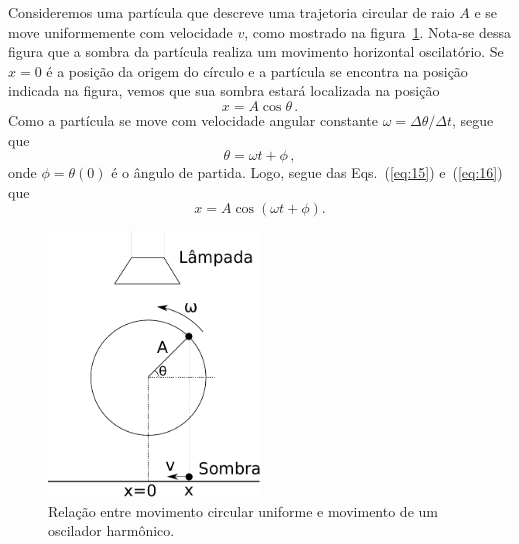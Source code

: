 \documentclass[12pt,a4paper]{article}
\theoremstyle{definition}
\begin{document}
Consideremos uma partícula que descreve uma trajetoria circular de
raio $A$ e se move uniformemente com velocidade $v$, como mostrado na
figura~\ref{fig:ociladoranalogia}. Nota-se dessa figura que a sombra
da partícula realiza um movimento horizontal oscilatório. Se $x=0$ é a
posição da origem do círculo e a partícula se encontra na posição
indicada na figura, vemos que sua sombra estará localizada na posição
\begin{equation}
  \label{eq:15}
  x=A\cos\theta\,.
\end{equation}
Como a partícula se move com velocidade angular constante
$\omega=\Delta\theta/\Delta t$, segue que
\begin{equation}
  \label{eq:16}
  \theta=\omega t+\phi\,,
\end{equation}
onde $\phi=\theta(0)$ é o ângulo de partida. Logo, segue das
Eqs.~(\ref{eq:15}) e~(\ref{eq:16}) que
\begin{equation}
  \label{eq:17}
  x=A\cos(\omega t+\phi).
\end{equation}

\begin{figure}[ht]
  \centering
  \includegraphics[width=0.5\textwidth,keepaspectratio]{aux/osciladoranalogia.pdf}
  \caption{Relação entre movimento circular uniforme e movimento de um
    oscilador harmônico.}
  \label{fig:ociladoranalogia}
\end{figure}
\end{document}
